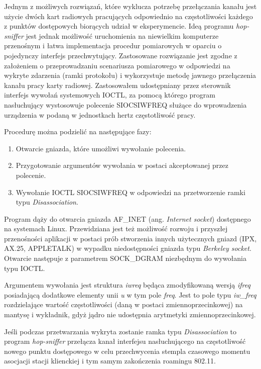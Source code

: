 Jednym z możliwych rozwiązań, które wyklucza potrzebę przełączania kanału jest użycie dwóch kart radiowych pracujących odpowiednio na częstotliwości każdego z punktów dostępowych biorących udział w eksperymencie. Ideą programu \emph{hop-sniffer} jest jednak możliwość uruchomienia na niewielkim komputerze przenośnym i łatwa implementacja procedur pomiarowych w oparciu o pojedynczy interfejs przechwytujący. 
Zastosowane rozwiązanie jest zgodne z założeniem o przeprowadzaniu scenariusza pomiarowego w odpowiedzi na wykryte zdarzenia (ramki protokołu) i wykorzystuje metodę jawnego przełączenia kanału pracy karty radiowej. Zastosowałem udostępniany przez sterownik interfejs wywołań systemowych IOCTL, za pomocą którego program nasłuchujący wystosowuje polecenie SIOCSIWFREQ służące do wprowadzenia urządzenia w podaną w jednostkach hertz częstotliwość pracy. 

Procedurę można podzielić na następujące fazy:
\begin{enumerate}
\item Otwarcie gniazda, które umożliwi wywołanie polecenia.
\item Przygotowanie argumentów wywołania w postaci akceptowanej przez polecenie.
\item Wywołanie IOCTL SIOCSIWFREQ w odpowiedzi na przetworzenie ramki typu \emph{Disassociation}.
\end{enumerate}

Program dąży do otwarcia gniazda AF\_INET (ang. \emph{Internet socket}) dostępnego na systemach Linux. Przewidziana jest też możliwość rozwoju i przyszłej przenośności aplikacji w postaci prób stworzenia innych użytecznych gniazd (IPX, AX.25, APPLETALK) w wypadku niedostępności gniazda typu \emph{Berkeley socket}. Otwarcie następuje z parametrem SOCK\_DGRAM niezbędnym do wywołania typu IOCTL.

Argumentem wywołania jest struktura \emph{iwreq} będąca zmodyfikowaną wersją \emph{ifreq} posiadającą dodatkowe elementy unii \emph{u} w tym pole \emph{freq}. Jest to pole typu \emph{iw\_freq} rozdzielające wartość częstotliwości (daną w postaci zmiennoprzecinkowej) na mantysę i wykładnik, gdyż jądro nie udostępnia arytmetyki zmiennoprzecinkowej.


Jeśli podczas przetwarzania wykryta zostanie ramka typu \emph{Disassociation} to program \emph{hop-sniffer} przełącza kanał interfejsu nasłuchującego na częstotliwość nowego punktu dostępowego w celu przechwycenia stempla czasowego momentu asocjacji stacji klienckiej i tym samym zakończenia roamingu 802.11.


